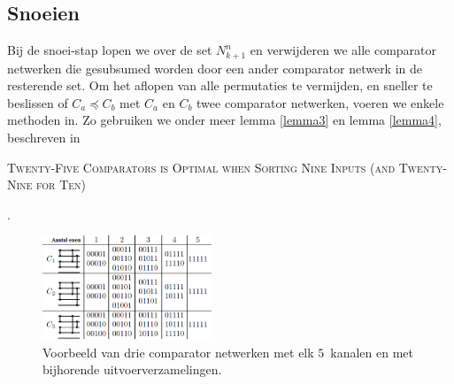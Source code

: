 \documentclass{article}
\begin{document}
\subsection{Snoeien}\label{Snoeien}
Bij de snoei-stap lopen we over de set $N^n_{k+1}$ en verwijderen we alle comparator netwerken die gesubsumed worden door een ander comparator netwerk in de resterende set.
Om het aflopen van alle permutaties te vermijden, en sneller te beslissen of $C_a \preceq C_b$ met $C_a$ en $C_b$ twee comparator netwerken, voeren we enkele methoden in.
Zo gebruiken we onder meer lemma \ref{lemma3} en lemma \ref{lemma4}, beschreven in 
\begin{small}
\textsc{Twenty-Five Comparators is Optimal when Sorting Nine Inputs (and Twenty-Nine for Ten)}
\end{small}
\cite{sortingNetworksSize2014}.

\begin{figure}[!h]
	\includegraphics[width=0.45\textwidth]{VoorbeeldLemmas.png}
	\caption{Voorbeeld van drie comparator netwerken met elk $5$~kanalen en met bijhorende uitvoerverzamelingen.\protect\cite{sortingNetworksSize2014}}
	\label{VoorbeeldLemmas}
\end{figure}
\end{document}
